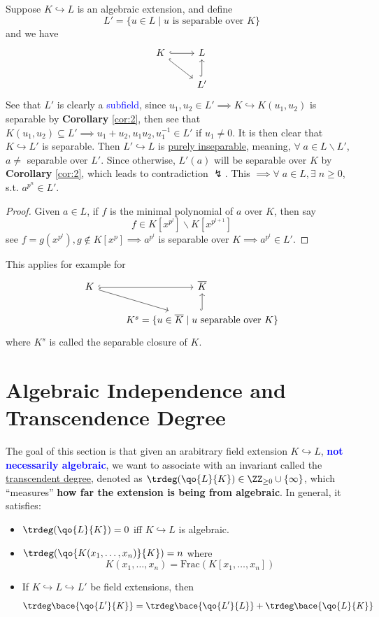 \begin{remark}
	Suppose \( K \hookrightarrow L \) is an algebraic extension, and define
	\[
		L' = \{u \in L \; | \; u \text{ is separable over }K\}
	\]
	and we have
	\[
		\begin{tikzcd}
			K \arrow[r,hook] \arrow[rd, hook] & L \\
			& L' \arrow[u, hook]
		\end{tikzcd}
	\]
	See that \( L' \) is clearly a \textcolor{blue}{subfield}, since \( u_1, u_2 \in L' \implies K
	\hookrightarrow K(u_1,u_2) \) is separable by \textbf{Corollary} \ref{cor:2},
	then see that \( K(u_1,u_2) \subseteq L' \implies u_1+u_2, u_1u_2, u_1^{-1} \in L' \) if \( u_1\ne
	0\). It is then clear that \( K \hookrightarrow L' \) is separable. Then \( L' \hookrightarrow L \) is
	\underline{purely inseparable}, meaning, \( \forall \; a\in L \smallsetminus L' \), \( a\ne \)
	separable over \( L' \). Since otherwise, \( L'(a) \) will be separable over \( K \) by
	\textbf{Corollary} \ref{cor:2}, which leads to contradiction \( \lightning \).
	This \( \implies \forall \; a\in L, \exists \; n \geq 0 \), s.t. \( a^{p^n} \in L' \).
	\begin{proof}
		Given \( a \in L \), if \( f \) is the minimal polynomial of \( a \) over \( K \), then say
		\[
			f \in K[x^{p^l}] \smallsetminus K[x^{p^{l+1}}]
		\]
		see \( f = g(x^{p^l}), g \not\in K[x^p] \implies a^{p^l} \) is separable over \( K \implies
		a^{p^l} \in L'\).
	\end{proof}
	This applies for example for
	\[
		\begin{tikzcd}
			K \arrow[r,hook] \arrow[rd, hook] & \overline{K} \\
			& K^s = \{u\in \overline{K} \; | \; u \text{ separable over }K\}\arrow[u, hook]
		\end{tikzcd}
	\]
	where \( K^s \) is called the separable closure of \( K \).
\end{remark}

\section{Algebraic Independence and Transcendence Degree}
The goal of this section is that given an arabitrary field extension \( K \hookrightarrow L \),
\textbf{\textcolor{blue}{not necessarily algebraic}}, we want to associate with an invariant called
the \underline{transcendent degree}, denoted as \( \trdeg(\qo{L}{K}) \in \ZZ_{\geq 0} \cup \{\infty\} \), which
``measures'' \textbf{how far the extension is being from algebraic}. In general, it satisfies:
\begin{itemize}
	\item \( \trdeg(\qo{L}{K}) = 0 \) iff \( K \hookrightarrow L \) is algebraic.
	\item \( \trdeg(\qo{K(x_1,\ldots, x_n)}{K}) = n \) where
	      \[
		      K (x_1,\ldots, x_n) = \text{Frac}(K[x_1, \ldots, x_n])
	      \]
	\item If \( K \hookrightarrow L \hookrightarrow L' \) be field extensions, then
	      \[
		      \trdeg\bace{\qo{L'}{K}} = \trdeg\bace{\qo{L'}{L}} + \trdeg\bace{\qo{L}{K}}
	      \]
\end{itemize}

